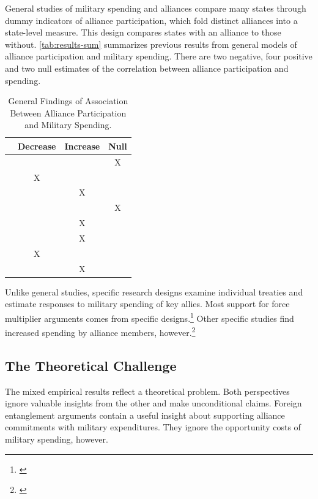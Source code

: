 \documentclass[12pt]{article}
\begin{document}
General studies of military spending and alliances compare many states through dummy indicators of alliance participation, which fold distinct alliances into a state-level measure. 
This design compares states with an alliance to those without.
\autoref{tab:results-sum} summarizes previous results from general models of alliance participation and military spending. 
There are two negative, four positive and two null estimates of the correlation between alliance participation and spending. 


\begin{table}[hbt!]
\begin{center}
\begin{tabular}{lccc}
     & Decrease & Increase & Null \\
\hline
\citet{MostSiverson1987} &  &  & X \\
\citet{Conybeare1994} & X & &  \\
\citet{Diehl1994} &  & X &  \\
\citet{Goldsmith2003} &  &  & X \\
\citet{MorganPalmer2006} &  & X & \\ 
\citet{QuirozFlores2011} &  & X &  \\ 
\citet{DigiuseppePoast2016} & X &  & \\ 
\citet{Horowitzetal2017} &  & X & \\ 
\hline
\end{tabular}
\caption{General Findings of Association Between Alliance Participation and Military Spending.}
\label{tab:results-sum}
\end{center} 
\end{table}


Unlike general studies, specific research designs examine individual treaties and estimate responses to military spending of key allies. 
Most support for force multiplier arguments comes from specific designs.\footnote{\cite{BarnettLevy1991, Morrow1993, Sorokin1994, PluemperNeumayer2015}}
Other specific studies find increased spending by alliance members, however.\footnote{\cite{ConybeareSandler1990, Chenetal1996}}


\subsection{The Theoretical Challenge}


The mixed empirical results reflect a theoretical problem. 
Both perspectives ignore valuable insights from the other and make unconditional claims.  
Foreign entanglement arguments contain a useful insight about supporting alliance commitments with military expenditures.
They ignore the opportunity costs of military spending, however. 
\end{document}
